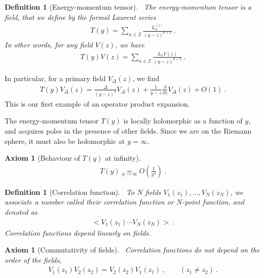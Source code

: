\documentclass[12pt, a4paper]{article}
\theoremstyle{break}
\newtheorem{hyp}[exo]{Axiom}
\newtheorem{defn}[exo]{Definition}
\begin{document}
\begin{defn}[Energy-momentum tensor]
 ~\label{def:em}
 The energy-momentum tensor is a field, that we define by the formal Laurent series
 \begin{align}
  T(y) = \sum_{n\in\mathbb{Z}} \frac{L_n^{(z)}}{(y-z)^{n+2}} \ .
 \end{align}
In other words, for any field $V(z)$, we have 
\begin{align}
 T(y)V(z) = \sum_{n\in\mathbb{Z}} \frac{L_n V(z)}{(y-z)^{n+2}}\ .
 \label{eq:lvtv}
\end{align}
\end{defn}
In particular, for a primary field $V_\Delta(z)$, we find 
\begin{align}
 T(y)V_\Delta(z) = \frac{\Delta}{(y-z)^2} V_\Delta(z) + \frac{1}{y-z} \frac{\partial}{\partial z} V_\Delta(z) + O(1)\ . 
 \label{eq:tvd}
\end{align}
This is our first example of an operator product expansion.

The energy-momentum tensor $T(y)$ is locally holomorphic as a function of $y$, and acquires poles in the presence of other fields. Since we are on the Riemann sphere, it must also be holomorphic at $y=\infty$. 

\begin{hyp}[Behaviour of $T(y)$ at infinity]
~\label{hyp:ti}
 \begin{align}
 T(y) \underset{y\to\infty} = O\left(\frac{1}{y^4}\right)\ .
 \label{eq:tinf}
\end{align}
\end{hyp}

\begin{defn}[Correlation function]
~\label{def:cor}
 To $N$ fields $V_1(z_1), \dots ,V_N(z_N)$, we associate a number called their correlation function or $N$-point function, and denoted as 
 \begin{align}
  \Big< V_1(z_1) \cdots V_N(z_N) \Big>\ .
 \end{align}
Correlation functions depend linearly on fields.
\end{defn}

\begin{hyp}[Commutativity of fields]
 ~\label{hyp:ass}
 Correlation functions do not depend on the order of the fields,
 \begin{align}
  V_1(z_1) V_2(z_2) = V_2(z_2)V_1(z_1)\ , \qquad (z_1\neq z_2)\ .
 \end{align}
\end{hyp}
\end{document}
